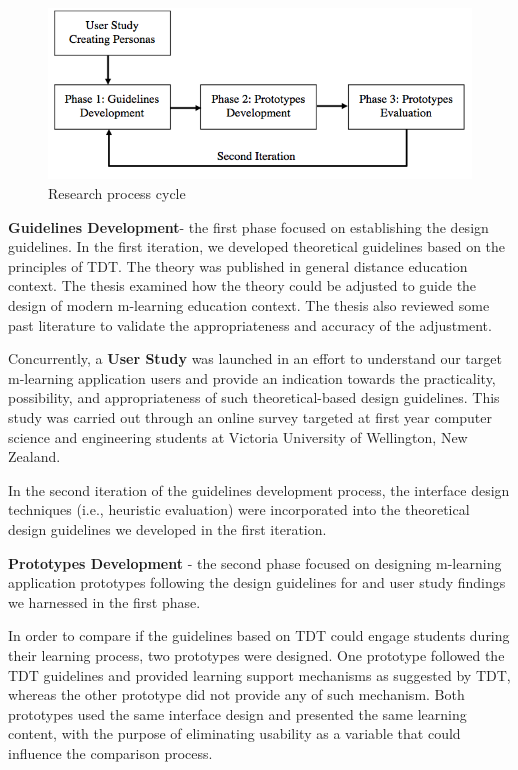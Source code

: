 \begin{figure}[!hbt]
\centering
\includegraphics[width=1.0 \textwidth]{chapter1}
\caption{Research process cycle}
\end{figure}

\textbf{Guidelines Development}- the first phase focused on establishing the design guidelines. In the first iteration, we developed theoretical guidelines based on the principles of TDT. The theory was published in general distance education context. The thesis examined how the theory could be adjusted to guide the design of modern m-learning education context. The thesis also reviewed some past literature to validate the appropriateness and accuracy of the adjustment. 

Concurrently, a \textbf{User Study} was launched in an effort to understand our target m-learning application users and provide an indication towards the practicality, possibility, and appropriateness of such theoretical-based design guidelines. This study was carried out through an online survey targeted at first year computer science and engineering students at Victoria University of Wellington, New Zealand. 

In the second iteration of the guidelines development process, the interface design techniques (i.e., heuristic evaluation) were incorporated into the theoretical design guidelines we developed in the first iteration. 

\textbf{Prototypes Development} - the second phase focused on designing m-learning application prototypes following the design guidelines for and user study findings we harnessed in the first phase. 

In order to compare if the guidelines based on TDT could engage students during their learning process, two prototypes were designed. One prototype followed the TDT guidelines and provided learning support mechanisms as suggested by TDT, whereas the other prototype did not provide any of such mechanism. Both prototypes used the same interface design and presented the same learning content, with the purpose of eliminating usability as a variable that could influence the comparison process. 

